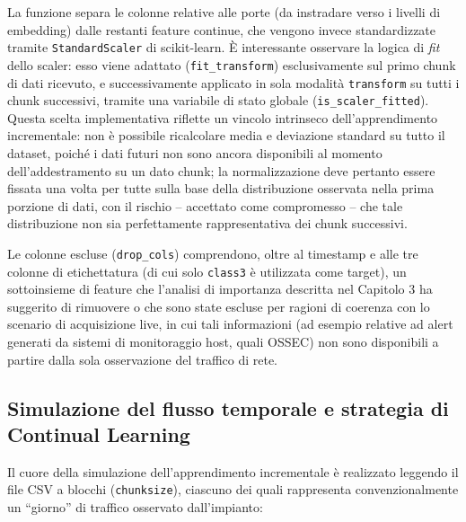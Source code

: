 \documentclass[12pt,a4paper]{report}
\begin{document}
La funzione separa le colonne relative alle porte (da instradare verso i livelli di embedding) dalle restanti feature continue, che vengono invece standardizzate tramite \texttt{StandardScaler} di scikit-learn. È interessante osservare la logica di \emph{fit} dello scaler: esso viene adattato (\texttt{fit\_transform}) esclusivamente sul primo chunk di dati ricevuto, e successivamente applicato in sola modalità \texttt{transform} su tutti i chunk successivi, tramite una variabile di stato globale (\texttt{is\_scaler\_fitted}). Questa scelta implementativa riflette un vincolo intrinseco dell'apprendimento incrementale: non è possibile ricalcolare media e deviazione standard su tutto il dataset, poiché i dati futuri non sono ancora disponibili al momento dell'addestramento su un dato chunk; la normalizzazione deve pertanto essere fissata una volta per tutte sulla base della distribuzione osservata nella prima porzione di dati, con il rischio -- accettato come compromesso -- che tale distribuzione non sia perfettamente rappresentativa dei chunk successivi.

Le colonne escluse (\texttt{drop\_cols}) comprendono, oltre al timestamp e alle tre colonne di etichettatura (di cui solo \texttt{class3} è utilizzata come target), un sottoinsieme di feature che l'analisi di importanza descritta nel Capitolo 3 ha suggerito di rimuovere o che sono state escluse per ragioni di coerenza con lo scenario di acquisizione live, in cui tali informazioni (ad esempio relative ad alert generati da sistemi di monitoraggio host, quali OSSEC) non sono disponibili a partire dalla sola osservazione del traffico di rete.

\subsection{Simulazione del flusso temporale e strategia di Continual Learning}

Il cuore della simulazione dell'apprendimento incrementale è realizzato leggendo il file CSV a blocchi (\texttt{chunksize}), ciascuno dei quali rappresenta convenzionalmente un ``giorno'' di traffico osservato dall'impianto:
\end{document}
